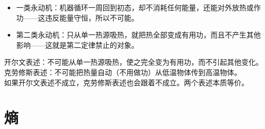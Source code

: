 \documentclass[lang=cn,11pt]{elegantbook}
\begin{document}
\begin{definition}[两个“永动机”]
    \begin{itemize}
    \item 一类永动机：机器循环一周回到初态，却不消耗任何能量，还能对外放热或作功——这违反能量守恒，所以不可能。
    \item 第二类永动机：只从单一热源吸热，就把热全部变成有用功，而且不产生其他影响——这就是第二定律禁止的对象。
    \end{itemize}
\end{definition}

\begin{definition}[热力学第二定律的两种表述]
    开尔文表述：不可能从单一热源吸热，使之完全变为有用功，而不引起其他变化。\\
    克劳修斯表述：不可能把热量自动（不用做功）从低温物体传到高温物体。\\
    如果开尔文表述不成立，克劳修斯表述也会跟着不成立。两个表述本质等价。
\end{definition}

\section{熵}
\end{document}
